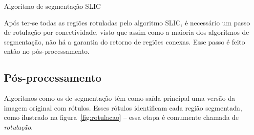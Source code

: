\begin{espacosimples}
\begin{algorithm2e}[H]
  \caption{Algoritmo de segmentação SLIC}
  \label{algo:slic}
  \SetAlgoLined



\end{algorithm2e}
\end{espacosimples}

\vspace{1.0cm}

Após ter-se todas as regiões rotuladas pelo algoritmo SLIC, é
necessário um passo de rotulação por conectividade, visto que assim
como a maioria dos algoritmos de segmentação, não há a garantia do
retorno de regiões conexas. Esse passo é feito então no
pós-processamento.

\subsection{Pós-processamento}
\label{sec:posproc}

Algoritmos como os de segmentação têm como saída principal uma versão
da imagem original com rótulos. Esses rótulos identificam cada região
segmentada, como ilustrado na figura~\ref{fig:rotulacao} -- essa etapa
é comumente chamada de \emph{rotulação}.


